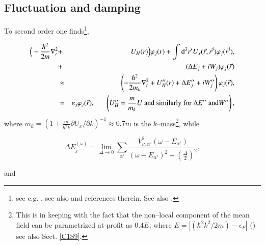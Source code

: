 \subsection{Fluctuation and damping}
 To second order one finds\footnote{see e.g. \cite{Brink:05}, see also \cite{Mahaux:85} and references therein. See also \cite{Bernard:81}.},

\begin{eqnarray}\label{eqn:36}
\nonumber
\Big( -\frac{\hbar^2}{2m} \nabla_r^2 &+& U_H(r)\Big) \varphi_{j}(r) + \int {\rm d}^3 r' U_x(\vec{r},\vec{r'})\varphi_j(\vec{r'}), \\
\nonumber
&+& (\Delta E_j +iW_j)\varphi_j(\vec{r}) \\
&\approx& \left( -\frac{\hbar^2}{2m_k} \nabla_r^2 + U_H''(r) + \Delta E''_j + iW''_j \right) \varphi_j(\vec{r}), \\
\nonumber
&=& \varepsilon_j\varphi_j(\vec{r}), \;\;\;\;\;\; \left( U_H'' = \frac{m}{m_k} U\text{ and similarly for }\Delta E''\text{ and} W'' \right), 
\end{eqnarray}
 where  $m_k=\left(1+\frac{m}{\hbar^2 k}\partial U_x/\partial k\right)^{-1}\approx 0.7m$ is the $k$--mass\footnote{This is in keeping with the fact that the non--local component of the mean field can be parametrized at profit as 0.4$E$, where $E=|(\hbar^2k^2/2m)-\epsilon_F|$ (\cite{Perey:62}) see also Sect. \ref{C1S9}.}, while

\begin{equation}\label{eqn:37a}
\Delta E_j^{(\omega)}  = \lim_{\Delta \rightarrow 0} \sum_{\alpha'} \frac{V^2_{\nu ,\alpha'} (\omega-E_{\alpha'})}{(\omega -E_{\alpha'})^2 + (\frac{\Delta}{2})^2},
\end{equation}

\noindent and

